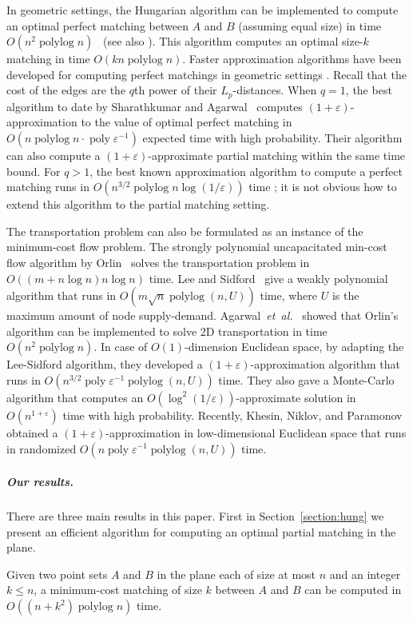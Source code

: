 \documentclass[a4paper,UKenglish,nolineno]{socg-lipics-v2019}
\def\etal{\emph{et~al.}}
\def\etal{\textit{et~al.}}
\def\poly{\mathop{\mathrm{poly}}}
\def\polylog{\mathop{\mathrm{polylog}}}
\def\eps{\varepsilon}
\begin{document}
In geometric settings, the Hungarian algorithm can be implemented to compute
an optimal perfect matching between $A$ and $B$ (assuming equal size)
in time $O(n^2\polylog n)$~\cite{KMRSS17} (see also \cite{Vaidya89,AES99}).
This algorithm computes an optimal size-$k$ matching in time $O(kn\polylog n)$.
Faster approximation algorithms have been developed for computing perfect
matchings in geometric settings \cite{Vaidya89,V98,AV04,SA12}.
Recall that the cost of the edges are the $q$th power of their $L_p$-distances.
When $q = 1$, the best algorithm to date by Sharathkumar and Agarwal~\cite{SA12m}
computes $(1+\eps)$-approximation to the value of optimal perfect matching in
$O(n\polylog n \cdot \poly\eps^{-1})$ expected time with high probability.
Their algorithm can also compute a $(1+\eps)$-approximate partial
matching within the same time bound.
For $q > 1$, the best known approximation algorithm to compute a perfect
matching runs in $O(n^{3/2}\polylog n \log(1/\eps))$ time \cite{SA12};
it is not obvious how to extend this algorithm to the partial matching setting.

The transportation problem can also be formulated as an instance of the
minimum-cost flow problem.
The strongly polynomial uncapacitated min-cost flow algorithm by
Orlin~\cite{O93} solves the transportation problem in
$O((m + n\log n) n\log n)$ time.
Lee and Sidford~\cite{LS14} give a weakly polynomial algorithm that runs in
$O(m\sqrt{n}\polylog(n, U))$ time, where $U$ is the maximum amount of node supply-demand.
Agarwal~\etal~\cite{AFPVX17, AFPVX17arxiv} showed that Orlin's algorithm can be
implemented to solve 2D transportation in time $O(n^2\polylog n)$.
In case of $O(1)$-dimension Euclidean space,
by adapting the Lee-Sidford algorithm, they developed a
$(1+\eps)$-approximation algorithm that runs in $O(n^{3/2} \poly\eps^{-1} \polylog(n, U))$ time.
They also gave a Monte-Carlo algorithm that computes an
$O(\log^2(1/\eps))$-approximate solution in $O(n^{1+\eps})$ time with
high probability.
Recently, Khesin, Niklov, and Paramonov~\cite{KNP19} obtained a
$(1+\eps)$-approximation in low-dimensional Euclidean space
that runs in randomized $O(n \poly\eps^{-1} \polylog(n, U))$ time.

\subparagraph{Our results.}
There are three main results in this paper.
First in Section~\ref{section:hung} we present an efficient algorithm for
computing an optimal partial matching in the plane.

\begin{theorem}
\label{theorem:hung}
Given two point sets $A$ and $B$ in the plane each of size at most $n$ and an
integer $k \leq n$, a minimum-cost matching of size $k$ between $A$ and $B$ can
be computed in $O((n + k^2)\polylog n)$ time.
\end{theorem}
\end{document}
